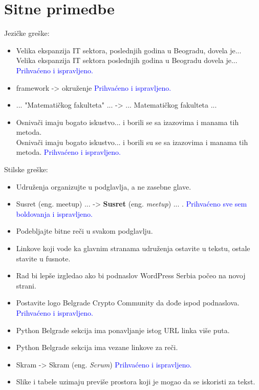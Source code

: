 \documentclass[a4paper]{report}
\newcommand{\odgovor}[1]{\textcolor{blue}{#1}}
\begin{document}
\section{Sitne primedbe}
Jezičke greške: \begin{itemize}
\item Velika ekspanzija IT sektora, poslednjih godina u Beogradu, dovela je...\\
      Velika ekspanzija IT sektora poslednjih godina u Beogradu dovela je...
      \odgovor{Prihvaćeno i ispravljeno.}
\item framework -> okruženje \odgovor{Prihvaćeno i ispravljeno.}
\item ... "Matematičkog fakulteta" ... -> ... Matematičkog fakulteta ... 
\item Osnivači imaju bogato iskustvo... i borili se sa izazovima i manama tih metoda. \\
      Osnivači imaju bogato iskustvo... i borili su se sa izazovima i manama tih metoda.
       \odgovor{Prihvaćeno i ispravljeno.}
\end{itemize}

Stilske greške:\begin{itemize}
\item Udruženja organizujte u podglavlja, a ne zasebne glave.
\item Susret (eng. meetup) ... -> \textbf{Susret} (eng. \textit{meetup}) ... .
\odgovor{Prihvaćeno sve sem boldovanja i ispravljeno.}
\item Podebljajte bitne reči u svakom podglavlju.
\item Linkove koji vode ka glavnim stranama udruženja ostavite u tekstu, ostale stavite u fusnote.
\item Rad bi lepše izgledao ako bi podnaslov WordPress Serbia počeo na novoj strani.
\item Postavite logo Belgrade Crypto Community da dođe ispod podnaslova.
\odgovor{Prihvaćeno i ispravljeno.} %
\item Python Belgrade sekcija ima ponavljanje istog URL linka više puta.
\item Python Belgrade sekcija ima vezane linkove za reči.
\item Skram -> Skram (eng. \textit{Scrum})
\odgovor{Prihvaćeno i ispravljeno.}
\item Slike i tabele uzimaju previše prostora koji je mogao da se iskoristi za tekst.
\end{itemize}
\end{document}
